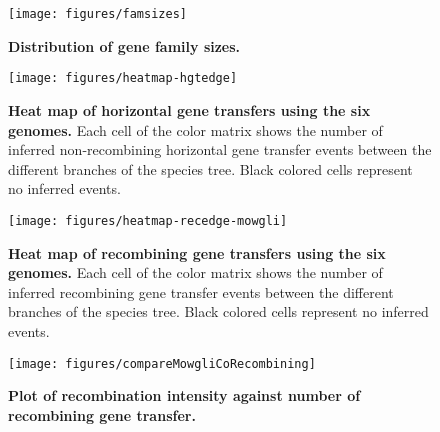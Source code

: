 \documentclass[10pt]{article}
\begin{document}
\begin{figure}[!ht]
\begin{center}
\texttt{[image: figures/famsizes]}
\end{center}
\caption{{\bf Distribution of gene family sizes.}}
\label{fig:famsizes}
\end{figure}
\clearpage{}

\begin{figure}[!ht]
\begin{center}
\texttt{[image: figures/heatmap-hgtedge]}
\end{center}
\caption{
{\bf Heat map of horizontal gene transfers using the six genomes.}
Each cell of the color matrix shows the number of inferred non-recombining
horizontal gene transfer events between the different branches of the species
tree. Black colored cells represent no inferred events.}
\label{fig:hgt-heatmap}
\end{figure}
\clearpage{}%

\begin{figure}[!ht]
\begin{center}
\texttt{[image: figures/heatmap-recedge-mowgli]}
\end{center}
\caption{
{\bf Heat map of recombining gene transfers using the six genomes.}
Each cell of the color matrix shows the number of inferred recombining
gene transfer events between the different branches of the species
tree. Black colored cells represent no inferred events.}
\label{fig:mowgli-recomb-heatmap}
\end{figure}
\clearpage{}

\begin{figure}[!ht]
\begin{center}
\texttt{[image: figures/compareMowgliCoRecombining]}
\end{center}
\caption{
{\bf Plot of recombination intensity against number
of recombining gene transfer.}}
\label{fig:cmpcomowgli}
\end{figure}
\clearpage{}
\end{document}
